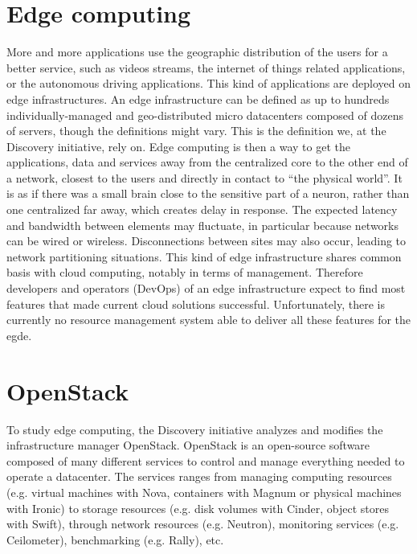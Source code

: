 \section{Edge computing}

More and more applications use the geographic distribution of the users for a better service, such as videos streams, the internet of things related applications, or the autonomous driving applications. This kind of applications are deployed on edge infrastructures. An edge infrastructure can be defined as up to hundreds individually-managed and geo-distributed micro datacenters composed of dozens of servers, though the definitions might vary. This is the definition we, at the Discovery initiative, rely on. Edge computing is then a way to get the applications, data and services away from the centralized core to the other end of a network, closest to the users and directly in contact to ``the physical world''. It is as if there was a small brain close to the sensitive part of a neuron, rather than one centralized far away, which creates delay in response. The expected latency and bandwidth between elements may fluctuate, in particular because networks can be wired or wireless. Disconnections between sites may also occur, leading to network partitioning situations. This kind of edge infrastructure shares common basis with cloud computing, notably in terms of management. Therefore developers and operators (DevOps) of an edge infrastructure expect to find most features that made current cloud solutions successful. Unfortunately, there is currently no resource management system able to deliver all these features for the egde.

\section{OpenStack}

To study edge computing, the Discovery initiative analyzes and modifies the infrastructure manager OpenStack. OpenStack is an open-source software composed of many different services to control and manage everything needed to operate a datacenter. The services ranges from managing computing resources (e.g. virtual machines with Nova, containers with Magnum or physical machines with Ironic) to storage resources (e.g. disk volumes with Cinder, object stores with Swift), through network resources (e.g. Neutron), monitoring services (e.g. Ceilometer), benchmarking (e.g. Rally), etc.

